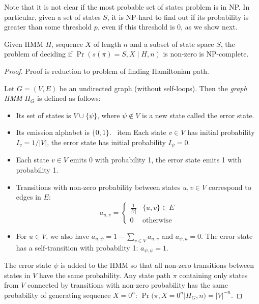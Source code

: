 \begin{reformulate*}
Note that it is not clear if the most probable set of states problem is in
NP. In particular, given a set of states $S$, it is NP-hard to find out if its
probability is greater than some threshold $p$, even if this threshold
is 0, as we show next.

\begin{theorem}
Given HMM $H$, sequence $X$ of length $n$ 
and a subset of state space $S$, the problem of deciding if
$\Pr\left(s(\pi)=S, X\mid H, n\right)$ is non-zero is NP-complete.
\end{theorem}

\begin{proof} Proof is reduction to problem of finding Hamiltonian path.

\begin{definition}\label{GraphHMM}
Let $G=(V,E)$ be an undirected graph (without self-loops). 
Then the \emph{graph HMM} $H_G$ is defined as follows:
\begin{itemize}
\item Its set of states is $V\cup \{\psi\}$, where $\psi\notin V$ is a
   new state called the error state.
\item Its emission alphabet is $\{0,1\}$.
\ item Each state $v\in V$ has initial probability $I_{v} = 1/|V|$, the
error state has initial probability $I_{\psi}=0$.
\item Each state $v\in V$ emits 0 with probability 1, the error state emits 1 
with probability 1.
\item Transitions with non-zero probability between states $u,v\in V$
  correspond to edges in $E$:
$$a_{u,v}=\begin{cases}
\frac1{|V|} & \{u,v\}\in E\\
0 & \text{otherwise}
\end{cases}$$
\item For $u\in V$, we also have $a_{u,\psi}=1-\sum_{v\in V}a_{u,v}$
and $a_{\psi,u}=0$. The error state has a self-transition with 
probability 1: $a_{\psi,\psi}=1$.
\end{itemize}
\end{definition}

The error state $\psi$ is added to the HMM so that all non-zero
transitions between states in $V$ have the same probability. Any state
path $\pi$ containing only states from $V$ connected by transitions
with non-zero probability has the same probability of generating
sequence $X=0^n$: $\Pr(\pi, X=0^n|H_G,n) = |V|^{-n}$.


\end{proof}
\end{reformulate*}
